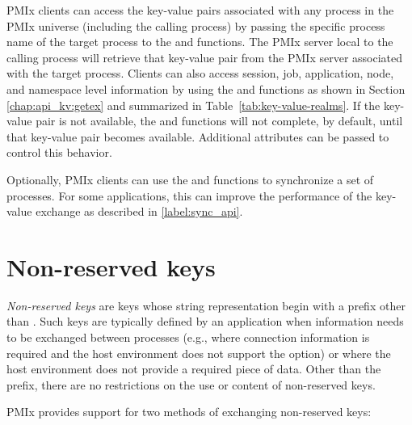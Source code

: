 \ac{PMIx} clients can access the key-value pairs associated with any process in the \ac{PMIx} universe (including the calling process) by passing the specific process name of the target process to the  and  functions.
The \ac{PMIx} server local to the calling process will retrieve that key-value pair from the \ac{PMIx} server associated with the target process.
Clients can also access session, job, application, node, and namespace level information by using the  and  functions as shown in Section \ref{chap:api_kv:getex} and summarized in Table~\ref{tab:key-value-realms}.
If the key-value pair is not available, the  and  functions will not complete, by default, until that key-value pair becomes available.
Additional attributes can be passed to control this behavior.

Optionally, \ac{PMIx} clients can use the  and  functions to synchronize a set of processes.  For some applications, this can improve the performance of the key-value exchange as described in \ref{label:sync_api}.

\section{Non-reserved keys}

\emph{Non-reserved keys} are keys whose string representation begin with a
prefix other than . Such keys are typically defined by an
application when information needs to be exchanged between processes (e.g.,
where connection information is required and the host environment does not
support the  option) or where the host environment does not
provide a required piece of data. Other than the prefix, there are no
restrictions on the use or content of non-reserved keys.

\ac{PMIx} provides support for two methods of exchanging non-reserved keys:

